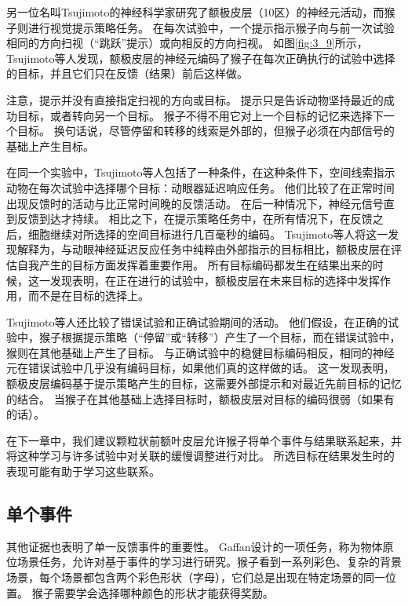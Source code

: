 另一位名叫Tsujimoto的神经科学家研究了额极皮层（10区）的神经元活动，而猴子则进行视觉提示策略任务\cite{tsujimoto2010evaluating}。
在每次试验中，一个提示指示猴子向与前一次试验相同的方向扫视（“跳跃”提示）或向相反的方向扫视。
如图\ref{fig:3_9}所示，Tsujimoto等人发现，额极皮层的神经元编码了猴子在每次正确执行的试验中选择的目标，并且它们只在反馈（结果）前后这样做。\par


注意，提示并没有直接指定扫视的方向或目标。
提示只是告诉动物坚持最近的成功目标，或者转向另一个目标。
猴子不得不用它对上一个目标的记忆来选择下一个目标。
换句话说，尽管停留和转移的线索是外部的，但猴子必须在内部信号的基础上产生目标。\par


在同一个实验中，Tsujimoto等人包括了一种条件，在这种条件下，空间线索指示动物在每次试验中选择哪个目标：动眼器延迟响应任务。
他们比较了在正常时间出现反馈时的活动与比正常时间晚的反馈活动。
在后一种情况下，神经元信号直到反馈到达才持续。
相比之下，在提示策略任务中，在所有情况下，在反馈之后，细胞继续对所选择的空间目标进行几百毫秒的编码。
Tsujimoto等人将这一发现解释为，与动眼神经延迟反应任务中纯粹由外部指示的目标相比，额极皮层在评估自我产生的目标方面发挥着重要作用。
所有目标编码都发生在结果出来的时候，这一发现表明，在正在进行的试验中，额极皮层在未来目标的选择中发挥作用，而不是在目标的选择上。\par


Tsujimoto等人还比较了错误试验和正确试验期间的活动。
他们假设，在正确的试验中，猴子根据提示策略（“停留”或“转移”）产生了一个目标，而在错误试验中，猴则在其他基础上产生了目标。
与正确试验中的稳健目标编码相反，相同的神经元在错误试验中几乎没有编码目标，如果他们真的这样做的话。
这一发现表明，额极皮层编码基于提示策略产生的目标，这需要外部提示和对最近先前目标的记忆的结合。
当猴子在其他基础上选择目标时，额极皮层对目标的编码很弱（如果有的话）。\par


在下一章中，我们建议颗粒状前额叶皮层允许猴子将单个事件与结果联系起来，并将这种学习与许多试验中对关联的缓慢调整进行对比。
所选目标在结果发生时的表现可能有助于学习这些联系。\par



\subsection{单个事件}

其他证据也表明了单一反馈事件的重要性。
Gaffan\cite{gaffan1992amnesia}设计的一项任务，称为物体原位场景任务，允许对基于事件的学习进行研究。猴子看到一系列彩色、复杂的背景场景，每个场景都包含两个彩色形状（字母），它们总是出现在特定场景的同一位置。
猴子需要学会选择哪种颜色的形状才能获得奖励。\par


